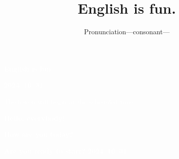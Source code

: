 \documentclass[aspectratio=169,xcolor={dvipsnames,table}]{beamer}
\title{English is fun.}
\subtitle{Pronunciation---consonant---}
\author{}
\institute[]{}
\date[]
\begin{document}
\begin{frame}
\raggedleft
  \textcolor{white}{\Huge\bfseries English is fun.}

\vfill

\raggedleft
 \textcolor{white}{\LARGE\bfseries 2024--10--31}

\vfill
\vfill
\vfill

\raggedleft
\textcolor{white}{\large The lesson will begin at the scheduled time.}
\end{frame}
\begin{frame}
\raggedleft
  \textcolor{white}{\Huge\bfseries Hello, everybody!}

\vfill

\raggedleft
 \textcolor{white}{\Huge\bfseries How are you today?}
\vfill

\raggedleft
 \textcolor{white}{\Huge\bfseries Are you ready to start?}
\vfill
\vfill
\vfill
\raggedleft
 \textcolor{white}{\Large\bfseries 2024--10--31}




\hypertarget{top_page}{}
\hyperlink{today}{}
\end{frame}
\end{document}
